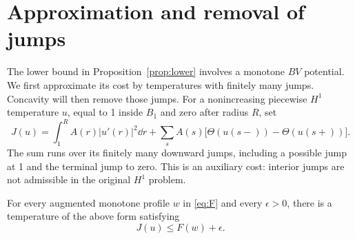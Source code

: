 \section{Approximation and removal of jumps}\label{sec:jumps}

The lower bound in Proposition~\ref{prop:lower} involves a monotone
\(BV\) potential. We first approximate its cost by temperatures with
finitely many jumps. Concavity will then remove those jumps.
For a nonincreasing piecewise \(H^1\) temperature \(u\), equal to 1
inside \(B_1\) and zero after radius \(R\), set
\begin{equation}\label{eq:J}
 J(u)=\int_1^R A(r)|u'(r)|^2\dd r+
       \sum_s A(s)\bigl[\Theta(u(s-))-\Theta(u(s+))\bigr].
\end{equation}
The sum runs over its finitely many downward jumps, including a possible
jump at 1 and the terminal jump to zero. This is an auxiliary cost:
interior jumps are not admissible in the original \(H^1\) problem.

\begin{proposition}\label{prop:approximation}
For every augmented monotone profile \(w\) in \eqref{eq:F} and every
\(\epsilon>0\), there is a temperature of the above form satisfying
\[
 J(u)\le F(w)+\epsilon .
\]
\end{proposition}

